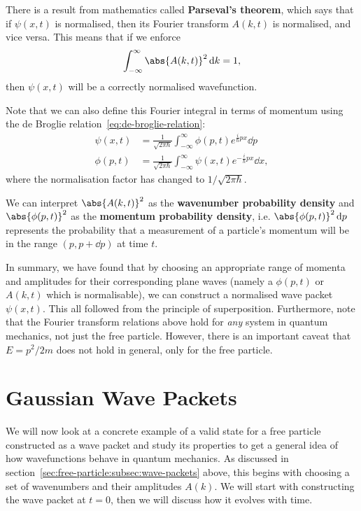 \documentclass[../quantum_mechanics.tex]{subfiles}
\begin{document}
            There is a result from mathematics called \textbf{Parseval's theorem}, which says that if $\psi(x,t)$ is normalised, then its Fourier transform $A(k,t)$ is normalised, and vice versa.
            This means that if we enforce
            \begin{equation}
                \int_{-\infty}^\infty\abs{A(k,t)}^2\dd{k}=1,
            \end{equation}
            then $\psi(x,t)$ will be a correctly normalised wavefunction.

            Note that we can also define this Fourier integral in terms of momentum using the de Broglie relation~\ref{eq:de-broglie-relation}:
            \begin{align}
                \psi(x,t)&=\frac{1}{\sqrt{2\pi\hbar}}\int_{-\infty}^\infty\phi(p,t)e^{\frac{i}{\hbar}px}\dd{p}\label{eq:psi-fourier-momentum}\\
                \phi(p,t)&=\frac{1}{\sqrt{2\pi\hbar}}\int_{-\infty}^\infty\psi(x,t)e^{-\frac{i}{\hbar}px}\dd{x},\label{eq:psi-fourier-momentum-inverse}
            \end{align}
            where the normalisation factor has changed to $1/\sqrt{2\pi\hbar}$.

            We can interpret $\abs{A(k,t)}^2$ as the \textbf{wavenumber probability density} and $\abs{\phi(p,t)}^2$ as the \textbf{momentum probability density}, i.e. $\abs{\phi(p,t)}^2\dd{p}$ represents the probability that a measurement of a particle's momentum will be in the range $(p,p+\dd{p})$ at time $t$.

            In summary, we have found that by choosing an appropriate range of momenta and amplitudes for their corresponding plane waves (namely a $\phi(p,t)$ or $A(k,t)$ which is normalisable), we can construct a normalised wave packet $\psi(x,t)$.
            This all followed from the principle of superposition.
            Furthermore, note that the Fourier transform relations above hold for \textit{any} system in quantum mechanics, not just the free particle.
            However, there is an important caveat that $E=p^2/2m$ does not hold in general, only for the free particle.


    \section{Gaussian Wave Packets}\label{sec:gaussian-wave-packets}
        We will now look at a concrete example of a valid state for a free particle constructed as a wave packet and study its properties to get a general idea of how wavefunctions behave in quantum mechanics.
        As discussed in section~\ref{sec:free-particle:subsec:wave-packets} above, this begins with choosing a set of wavenumbers and their amplitudes $A(k)$.
        We will start with constructing the wave packet at $t=0$, then we will discuss how it evolves with time.
\end{document}
